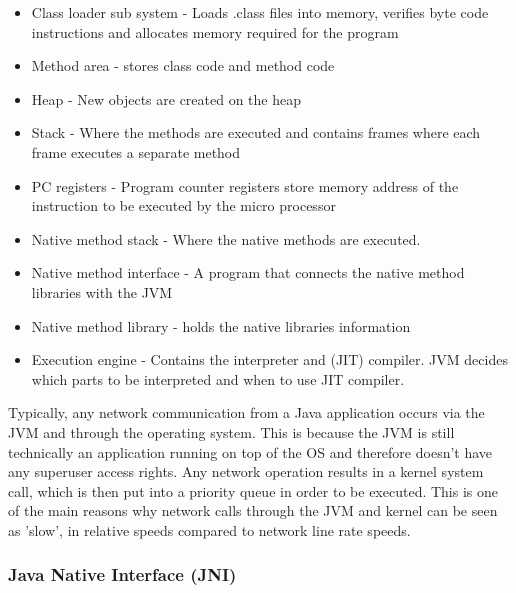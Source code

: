 \documentclass[final_report.tex]{subfiles}
\begin{document}
\begin{itemize}
	\item Class loader sub system - Loads .class files into memory, verifies byte code instructions and allocates memory required for the program
	\item Method area - stores class code and method code
	\item Heap - New objects are created on the heap
	\item Stack - Where the methods are executed and contains frames where each frame executes a separate method
	\item PC registers - Program counter registers store memory address of the instruction to be executed by the micro processor
	\item Native method stack - Where the native methods are executed.
	\item Native method interface - A program that connects the native method libraries with the JVM
	\item Native method library - holds the native libraries information
	\item Execution engine - Contains the interpreter and (JIT) compiler. JVM decides which parts to be interpreted and when to use JIT compiler.
\end{itemize}

Typically, any network communication from a Java application occurs via the JVM and through the operating system. This is because the JVM is still technically an application running on top of the OS and therefore doesn't have any superuser access rights. Any network operation results in a kernel system call, which is then put into a priority queue in order to be executed. This is one of the main reasons why network calls through the JVM and kernel can be seen as 'slow', in relative speeds compared to network line rate speeds.

\subsubsection{Java Native Interface (JNI)}
\label{subsec:jni}
\end{document}
